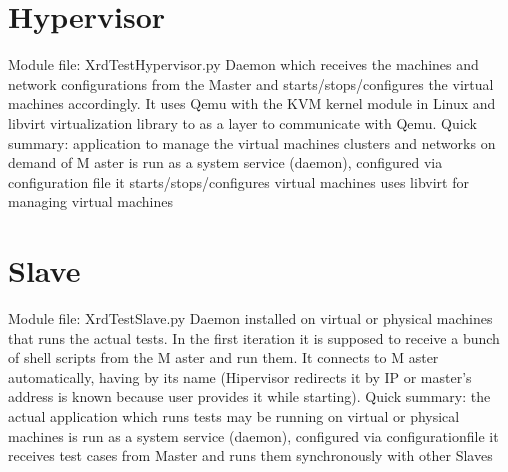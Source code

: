 \documentclass[letterpaper,10pt,english]{sphinxmanual}
\begin{document}
\section{Hypervisor}
\label{general-overview:hypervisor}\label{general-overview:id2}
Module file: XrdTestHypervisor.py
Daemon which receives the machines and network configurations from the Master and
starts/stops/configures the virtual machines accordingly. It uses Qemu with the KVM
kernel module
in Linux and libvirt virtualization library to as a layer to communicate with Qemu.
Quick summary:
application to manage the virtual machines clusters and networks on demand of M
aster
is run as a system service (daemon), configured via configuration file
it starts/stops/configures virtual machines
uses libvirt for managing virtual machines


\section{Slave}
\label{general-overview:slave}\label{general-overview:id3}
Module file: XrdTestSlave.py
Daemon installed on virtual or physical machines that runs the actual tests. In the first iteration it is
supposed to receive a bunch of shell scripts from the M
aster and run them. It connects to M
aster
automatically, having by its name (Hipervisor redirects it by IP or master's address is known
because user provides it while starting).
Quick summary:
the actual application which runs tests
may be running on virtual or physical machines
is run as a system service (daemon), configured via configurationfile
it receives test cases from Master and runs them synchronously with other Slaves
\end{document}
